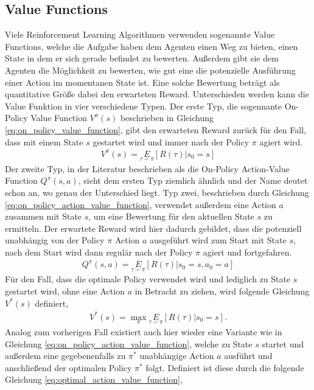 \documentclass[]{iat}
\begin{document}
\subsection{Value Functions}
Viele Reinforcement Learning Algorithmen verwenden sogenannte Value Functions, welche die Aufgabe haben dem Agenten einen Weg zu bieten, einen State in dem er sich gerade befindet zu bewerten. Außerdem gibt sie dem Agenten die Möglichkeit zu bewerten, wie gut eine die potenzielle Ausführung einer Action im momentanen State ist. Eine solche Bewertung beträgt als quantitative Größe dabei den erwarteten Reward. Unterschieden werden kann die Value Funktion in vier verschiedene Typen. Der erste Typ, die sogennante On-Policy Value Function $V^{\pi}(s)$ beschrieben in Gleichung \ref{eq:on_policy_value_function}, gibt den erwarteten Reward zurück für den Fall, dass mit einem State $s$ gestartet wird und immer nach der Policy $\pi$ agiert wird.
\begin{align}
    V^{\pi}(s) = \underset{\tau \backsim \pi}{E}\left[R(\tau)|s_0 = s\right] \label{eq:on_policy_value_function}
\end{align}
Der zweite Typ, in der Literatur beschrieben als die On-Policy Action-Value Function $Q^{\pi}(s,a)$, sieht dem ersten Typ ziemlich ähnlich und der Name deutet schon an, wo genau der Unterschied liegt. Typ zwei, beschrieben durch Gleichung \ref{eq:on_policy_action_value_function}, verwendet außerdem eine Action $a$ zusammen mit State $s$, um eine Bewertung für den aktuellen State $s$ zu ermitteln. Der erwartete Reward wird hier dadurch gebildet, dass die potenziell unabhängig von der Policy $\pi$ Action $a$ ausgeführt wird zum Start mit State $s$, nach dem Start wird dann regulär nach der Policy $\pi$ agiert und fortgefahren.
\begin{align}
    Q^{\pi}(s,a) = \underset{\tau \backsim \pi}{E}\left[R(\tau)|s_0 = s, a_0 = a\right] \label{eq:on_policy_action_value_function}
\end{align}
Für den Fall, dass die optimale Policy verwendet wird und lediglich zu State $s$ gestartet wird, ohne eine Action $a$ in Betracht zu ziehen, wird folgende Gleichung $V^*(s)$ definiert,
\begin{align}
    V^{*}(s) = \underset{\pi}{\max}\underset{\tau \backsim \pi}{E}\left[R(\tau)|s_0 = s\right]. \label{eq:optimal_value_function}
\end{align}
Analog zum vorherigen Fall existiert auch hier wieder eine Variante wie in Gleichung \ref{eq:on_policy_action_value_function}, welche zu State $s$ startet und außerdem eine gegebenenfalls zu $\pi^*$ unabhängige Action $a$ ausführt und anschließend der optimalen Policy $\pi^*$ folgt. Definiert ist diese durch die folgende Gleichung \ref{eq:optimal_action_value_function},
\end{document}
